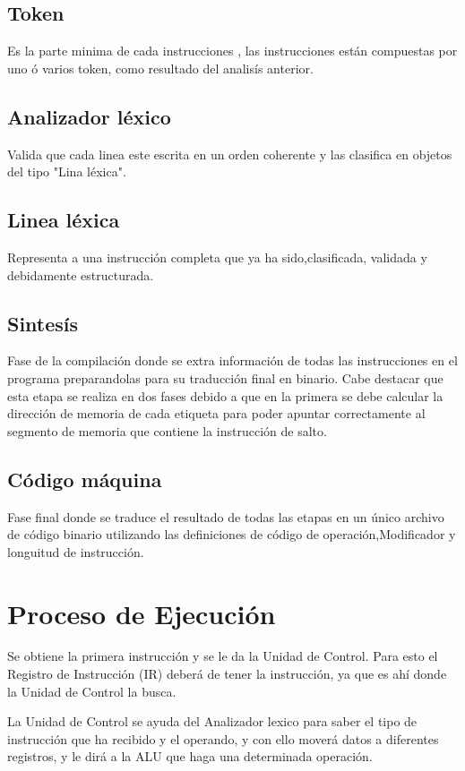 \documentclass[conference]{IEEEtran}
\begin{document}
\subsection{Token}
Es la parte minima de cada instrucciones , las instrucciones están compuestas por uno ó varios token, como resultado del analisís anterior.
\subsection{Analizador léxico}
Valida que cada linea este escrita en un orden coherente y las clasifica en objetos del tipo "Lina léxica".
\subsection{Linea léxica}
Representa a una instrucción completa que ya ha sido,clasificada, validada y debidamente estructurada.
\subsection{Sintesís}
Fase de la compilación donde se extra información de todas las instrucciones en el programa preparandolas para su traducción final en binario.
Cabe destacar que esta etapa se realiza en dos fases debido a que en la primera se debe calcular la dirección de memoria de cada etiqueta para poder apuntar correctamente al segmento de memoria que contiene la instrucción de salto. 
\subsection{Código máquina}
Fase final donde se traduce el resultado de todas las etapas en un único archivo de código binario utilizando las definiciones de código de operación,Modificador y longuitud de instrucción.




\newpage
\section{Proceso de Ejecución}
Se obtiene la primera instrucción y se le da la
Unidad de Control. Para esto el Registro de
Instrucción (IR) deberá de tener la instrucción,
ya que es ahí donde la Unidad de Control la
busca.

La Unidad de Control se ayuda del
Analizador lexico para saber el tipo de instrucción
que ha recibido y el operando, y con ello
moverá datos a diferentes registros, y le dirá a
la ALU que haga una determinada operación.
\end{document}

